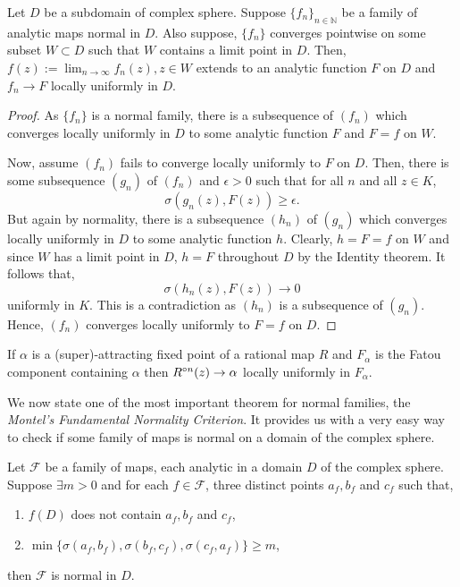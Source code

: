 \begin{theorem}
		Let \( D \) be a subdomain of complex sphere. Suppose \( \{f_n\}_{n\in\mathbb{N}} \)	be a family of analytic maps normal in \( D \). Also suppose, \( \{f_n\} \) converges pointwise on some subset \( W\subset D \) such that \( W \) contains a limit point in \( D \). Then, \( f(z):=\lim_{n \to \infty} f_n(z), z\in W \) extends to an analytic function \( F \) on \( D \) and \( f_n\to F \) locally uniformly in \( D \).
\end{theorem}
\begin{proof}
	As \( \{f_n\} \) is a normal family, there is a subsequence of \( (f_n) \) which converges locally uniformly in \( D \)
	to some analytic function \( F \) and \( F=f \) on \( W \).

	Now, assume \( (f_n) \) fails to converge locally uniformly to \( F \) on \( D \). Then, there is some subsequence \( (g_n) \)
	of \( (f_n) \) and \( \epsilon>0 \) such that for all \( n \) and all \( z\in K \),\[
		\sigma(g_n(z),F(z))\ge \epsilon
	.\] But again by normality, there is a subsequence \( (h_n) \) of \( (g_n) \) which converges locally uniformly in \( D \)
	to some analytic function \( h \). Clearly, \( h=F=f \) on \( W \) and since \( W \) has a limit point in \( D \),
	\( h=F \) throughout \( D \) by the Identity theorem. It follows that, \[
		\sigma(h_n(z),F(z))\to 0
	\]  uniformly in \( K \). This is a contradiction as \( (h_n) \) is a subsequence of \( (g_n) \).
	Hence, \( (f_n) \) converges locally uniformly to \( F=f \) on \( D \).
\end{proof}

\begin{corollary}\label{lem1.2}
	If \( \alpha \) is a (super)-attracting fixed point of a rational map \( R \) and \( F_\alpha \) is the
	Fatou component containing \( \alpha \) then \( \ror[n](z)\to \alpha \)
	locally uniformly in \( F_\alpha \).
\end{corollary}

We now state one of the most important theorem for normal families, the \emph{Montel's Fundamental Normality Criterion}.
It provides us with a very easy way to check if some family of maps is normal on a domain of the complex sphere.
\begin{theorem}
	Let \( \mathcal{F} \) be a family of maps, each analytic in a domain \( D \) of the complex sphere.
	Suppose \( \exists m>0 \) and for each \( f\in \mathcal{F} \), three distinct points \( a_f,b_f \) and \( c_f \) such that,
	\begin{enumerate}
		\item \( f(D) \) does not contain \( a_f,b_f \) and \( c_f \),
		\item \(\min\{\sigma(a_f,b_f),\sigma(b_f,c_f),\sigma(c_f,a_f)\}\geq m\),
	\end{enumerate}
	then \( \mathcal{F} \) is normal in \( D \).
\end{theorem}

